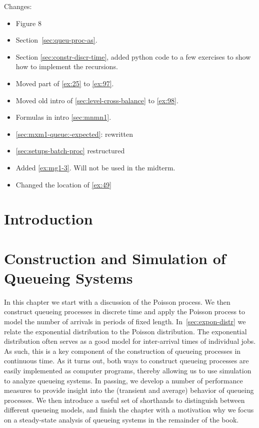 \author{Nicky D. van  Foreest}


\frontmatter
\maketitle

Changes:
\begin{itemize}
\item Figure 8
\item Section~\ref{sec:queu-proc-as}.
\item Section \ref{sec:constr-discr-time}, added python code to a few exercises to show how to implement the recursions.
\item Moved part of \cref{ex:25} to \cref{ex:97}.
\item Moved old intro of \cref{sec:level-cross-balance} to \cref{ex:98}.
\item Formulas in intro \cref{sec:mnmn1}.
\item \cref{sec:mxm1-queue:-expected}: rewritten
\item \cref{sec:setups-batch-proc} restructured
\item Added \cref{ex:mg1-3}. Will not be used in the midterm.
\item Changed the location of \cref{ex:49}
\end{itemize}


\tableofcontents

\chapter{Introduction}
\label{cha:introduction}



\mainmatter

\chapter{Construction and Simulation of Queueing Systems}
\label{cha:single-stat-queu}

In this chapter we start with a discussion of the Poisson process.
We then construct queueing processes in discrete time and apply the Poisson process to model the number of arrivals in periods of fixed length.
In~\cref{sec:expon-distr} we relate the exponential distribution to the Poisson distribution.
The exponential distribution often serves as a good model for inter-arrival times of individual jobs.
As such, this is a key component of the construction of queueing processes in continuous time.
As it turns out, both ways to construct queueing processes are easily implemented as computer programs, thereby allowing us to use simulation to analyze queueing systems.
In passing, we develop a number of performance measures to provide insight into the (transient and average) behavior of queueing processes.
We then introduce a useful set of shorthands to distinguish between different queueing models, and finish the chapter with a motivation why we focus on a steady-state analysis of queueing systems in the remainder of the book.

